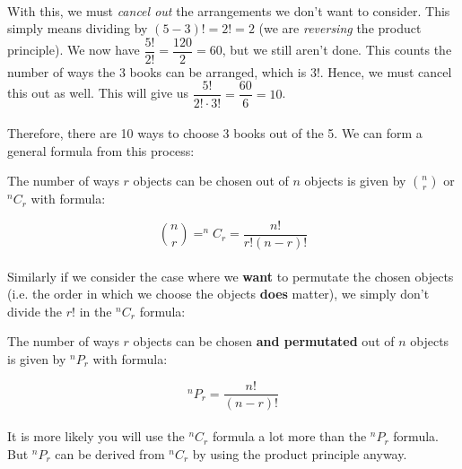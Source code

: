 \documentclass[12pt, a4paper, titlepage, twoside]{article}
\begin{document}
	\paragraph{}
	With this, we must \textit{cancel out} the arrangements we don't want to consider. This simply means dividing by $(5-3)! = 2! = 2$ 
	(we are \textit{reversing} the product principle). We now have $\dfrac{5!}{2!} = \dfrac{120}{2} = 60$, but we still aren't done. 
	This counts the number of ways the $3$ books can be arranged, which is $3!$. Hence, we must cancel this out as well. This will give 
	us $\dfrac{5!}{2! \cdot 3!} = \dfrac{60}{6} = 10$.
	
	\paragraph{}
	Therefore, there are 10 ways to choose 3 books out of the 5. We can form a general formula from this process:\\
	
	\begin{kp}
		The number of ways $r$ objects can be chosen out of $n$ objects is given by ${n \choose r}$ or $^nC_r$ with formula:
		
		$${n \choose r} = ^nC_r = \dfrac{n!}{r! (n-r)!}$$
	\end{kp}
	
	\paragraph{}
	Similarly if we consider the case where we \textbf{want} to permutate the chosen objects (i.e. the order in which we choose the objects
	\textbf{does} matter), we simply don't divide the $r!$ in the $^nC_r$ formula:\\
	
	\begin{kp}
		The number of ways $r$ objects can be chosen \textbf{and permutated} out of $n$ objects is given by $^nP_r$ with formula:
		
		$$^nP_r = \dfrac{n!}{(n-r)!}$$
	\end{kp}
	
	\paragraph{}
	It is more likely you will use the $^nC_r$ formula a lot more than the $^nP_r$ formula. But $^nP_r$ can be derived from $^nC_r$
	by using the product principle anyway.\\
	
\end{document}
